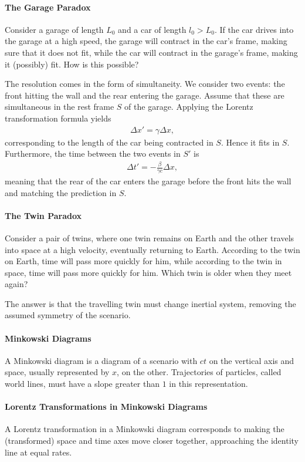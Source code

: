 \paragraph{The Garage Paradox}
Consider a garage of length $L_{0}$ and a car of length $l_{0} > L_{0}$. If the car drives into the garage at a high speed, the garage will contract in the car's frame, making sure that it does not fit, while the car will contract in the garage's frame, making it (possibly) fit. How is this possible?

The resolution comes in the form of simultaneity. We consider two events: the front hitting the wall and the rear entering the garage. Assume that these are simultaneous in the rest frame $S$ of the garage. Applying the Lorentz transformation formula yields
\begin{align*}
	\Delta x' = \gamma\Delta x,
\end{align*}
corresponding to the length of the car being contracted in $S$. Hence it fits in $S$. Furthermore, the time between the two events in $S'$ is
\begin{align*}
	\Delta t' = -\frac{\beta}{\gamma c}\Delta x,
\end{align*}
meaning that the rear of the car enters the garage before the front hits the wall and matching the prediction in $S$.

\paragraph{The Twin Paradox}
Consider a pair of twins, where one twin remains on Earth and the other travels into space at a high velocity, eventually returning to Earth. According to the twin on Earth, time will pass more quickly for him, while according to the twin in space, time will pass more quickly for him. Which twin is older when they meet again?

The answer is that the travelling twin must change inertial system, removing the assumed symmetry of the scenario.

\paragraph{Minkowski Diagrams}
A Minkowski diagram is a diagram of a scenario with $ct$ on the vertical axis and space, usually represented by $x$, on the other. Trajectories of particles, called world lines, must have a slope greater than $1$ in this representation.

\paragraph{Lorentz Transformations in Minkowski Diagrams}
A Lorentz transformation in a Minkowski diagram corresponds to making the (transformed) space and time axes move closer together, approaching the identity line at equal rates.